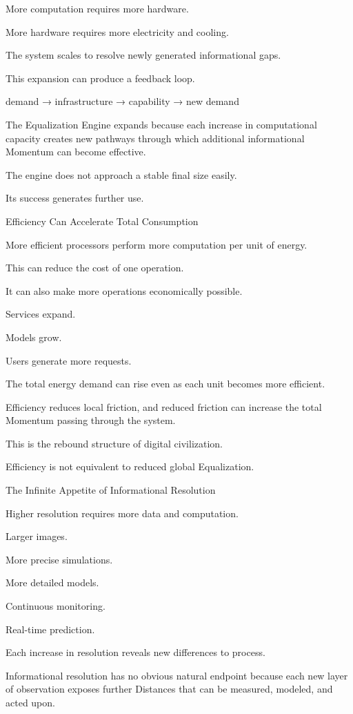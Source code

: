 More computation requires more hardware.

More hardware requires more electricity and cooling.

The system scales to resolve newly generated informational gaps.

This expansion can produce a feedback loop.

demand → infrastructure → capability → new demand

The Equalization Engine expands because each increase in computational capacity creates new pathways through which additional informational Momentum can become effective.

The engine does not approach a stable final size easily.

Its success generates further use.

Efficiency Can Accelerate Total Consumption

More efficient processors perform more computation per unit of energy.

This can reduce the cost of one operation.

It can also make more operations economically possible.

Services expand.

Models grow.

Users generate more requests.

The total energy demand can rise even as each unit becomes more efficient.

Efficiency reduces local friction, and reduced friction can increase the total Momentum passing through the system.

This is the rebound structure of digital civilization.

Efficiency is not equivalent to reduced global Equalization.

The Infinite Appetite of Informational Resolution

Higher resolution requires more data and computation.

Larger images.

More precise simulations.

More detailed models.

Continuous monitoring.

Real-time prediction.

Each increase in resolution reveals new differences to process.

Informational resolution has no obvious natural endpoint because each new layer of observation exposes further Distances that can be measured, modeled, and acted upon.

